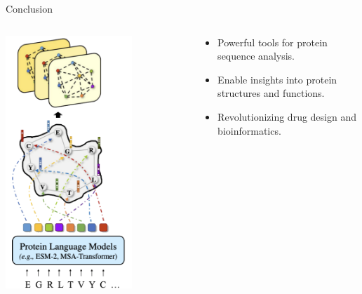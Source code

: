 \begin{frame}{Conclusion}
    \begin{columns}
        \begin{column}{0.5\textwidth}
            \centering
            \includegraphics[width=0.7\textwidth]{images/conclusion.PNG} 
        \end{column}
        
        \begin{column}{0.5\textwidth}
            \begin{itemize}
            \item Powerful tools for protein sequence analysis.
            \item Enable insights into protein structures and functions.
            \item Revolutionizing drug design and bioinformatics.
        \end{itemize}
        \end{column}
    \end{columns}
\end{frame}
